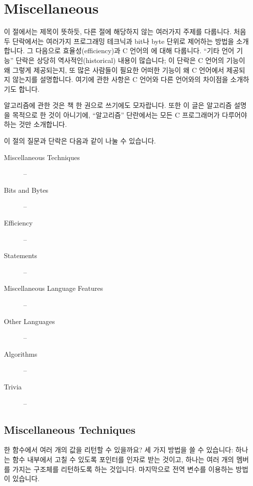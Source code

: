 \chapter{Miscellaneous}	\label{chap:misc}

이 절에서는 제목이 뜻하듯, 다른 절에 해당하지 않는 여러가지 주제를
다룹니다.  처음 두 단락에서는 여러가지 프로그래밍 테크닉과 bit나 byte 단위로
제어하는 방법을 소개합니다.  그 다음으로 효율성(efficiency)과 C 언어의
에 대해 다룹니다.  ``기타 언어 기능'' 단락은 상당히
역사적인(historical) 내용이 많습니다; 이 단락은 C 언어의 기능이 왜
그렇게 제공되는지, 또 많은 사람들이 필요한 어떠한 기능이 왜 C 언어에서
제공되지 않는지를 설명합니다.  여기에 관한 사항은 C 언어와 다른 언어와의
차이점을 소개하기도 합니다.

알고리즘에 관한 것은 책 한 권으로 쓰기에도 모자랍니다.  또한 이 글은
알고리즘 설명을 목적으로 한 것이 아니기에, ``알고리즘'' 단란에서는
모든 C 프로그래머가 다루어야 하는 것만 소개합니다.  

이 절의 질문과 단락은 다음과 같이 나눌 수 있습니다.

\begin{description}
\item[Miscellaneous Techniques]          -- 
\item[Bits and Bytes]                    -- 
\item[Efficiency]                        -- 
\item[ Statements]            -- 
\item[Miscellaneous Language Features]   -- 
\item[Other Languages]                   -- 
\item[Algorithms]                        -- 
\item[Trivia]                            -- 
\end{description}

\section{Miscellaneous Techniques}	\label{sec:misctech}

\begin{faq}
	한 함수에서 여러 개의 값을 리턴할 수 있을까요?
\A
	세 가지 방법을 쓸 수 있습니다: 하나는 함수 내부에서 고칠 수 있도록
	포인터를 인자로 받는 것이고, 하나는 여러 개의 멤버를 가지는
	구조체를 리턴하도록 하는 것입니다.  마지막으로 전역 변수를
	이용하는 방법이 있습니다.  
\end{faq}


